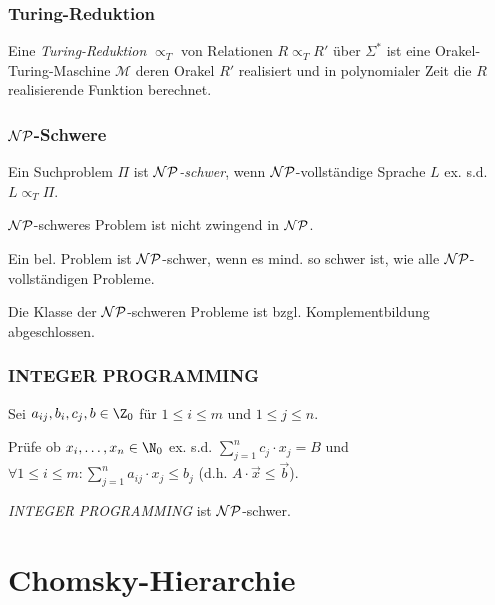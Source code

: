 \subsubsection*{Turing-Reduktion}

Eine \emph{Turing-Reduktion} $\propto_T$ von Relationen $R \propto_T R'$ über $\Sigma^*$ ist eine Orakel-Turing-Maschine $\mathcal{M}$ deren Orakel $R'$ realisiert und in polynomialer Zeit die $R$ realisierende Funktion berechnet.

\subsubsection*{$\mathcal{NP}$-Schwere}

Ein Suchproblem $\Pi$ ist \emph{$\mathcal{NP}$-schwer}, wenn $\mathcal{NP}$-vollständige Sprache $L$ ex. s.d. $L \propto_T \Pi$.

$\mathcal{NP}$-schweres Problem ist nicht zwingend in $\mathcal{NP}$.

Ein bel. Problem ist $\mathcal{NP}$-schwer, wenn es mind. so schwer ist, wie alle $\mathcal{NP}$-vollständigen Probleme.

\spacing

Die Klasse der $\mathcal{NP}$-schweren Probleme ist bzgl. Komplementbildung abgeschlossen.

\subsubsection*{INTEGER PROGRAMMING}

Sei $a_{ij}, b_i, c_j, b \in \Z_0$ für $1 \leq i \leq m$ und $1 \leq j \leq n$.

Prüfe ob $x_i, \dots, x_n \in \N_0$ ex. s.d. $\sum_{j=1}^n c_j \cdot x_j = B$ und $\forall 1 \leq i \leq m : \sum_{j=1}^n a_{ij} \cdot x_j \leq b_j$ (d.h. $A \cdot \vec{x} \leq \vec{b}$).

\emph{INTEGER PROGRAMMING} ist $\mathcal{NP}$-schwer.


\section*{Chomsky-Hierarchie}

